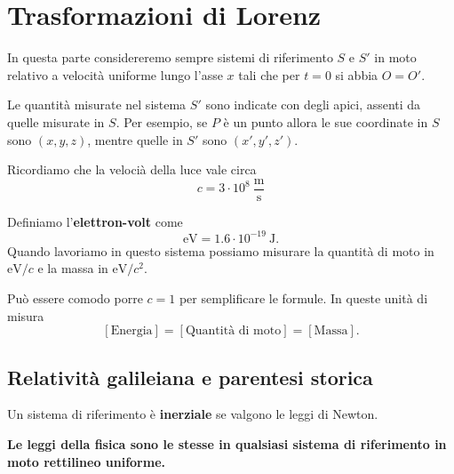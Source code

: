 \chapter{Trasformazioni di Lorenz}
In questa parte considereremo sempre sistemi di riferimento $S$ e $S'$ in moto relativo a velocit\`a uniforme lungo l'asse $x$ tali che per $t=0$ si abbia $O=O'$.
\begin{notation}
Le quantit\`a misurate nel sistema $S'$ sono indicate con degli apici, assenti da quelle misurate in $S$. Per esempio, se $P$ \`e un punto allora le sue coordinate in $S$ sono $(x,y,z)$, mentre quelle in $S'$ sono $(x',y',z')$.
\end{notation}

\noindent Ricordiamo che la veloci\`a della luce vale circa
\[c= 3\cdot 10^8\ \frac{\mathrm{m}}{\mathrm{s}}\]


\begin{definition}
Definiamo l'\textbf{elettron-volt} come
\[\mathrm{eV}=1.6\cdot 10^{-19}\ \mathrm{J}.\]
Quando lavoriamo in questo sistema possiamo misurare la quantit\`a di moto in $\mathrm{eV}/c$ e la massa in $\mathrm{eV}/c^2$.
\end{definition}


\begin{definition}
Pu\`o essere comodo porre $c=1$ per semplificare le formule. In queste unit\`a di misura
\[[\text{Energia}]=[\text{Quantit\`a di moto}]=[\text{Massa}].\]
\end{definition}


\section{Relativit\`a galileiana e parentesi storica}
\begin{definition}
Un sistema di riferimento \`e \textbf{inerziale} se valgono le leggi di Newton.
\end{definition}

\begin{fact}
\textbf{Le leggi della fisica sono le stesse in qualsiasi sistema di riferimento in moto rettilineo uniforme.}
\end{fact}

